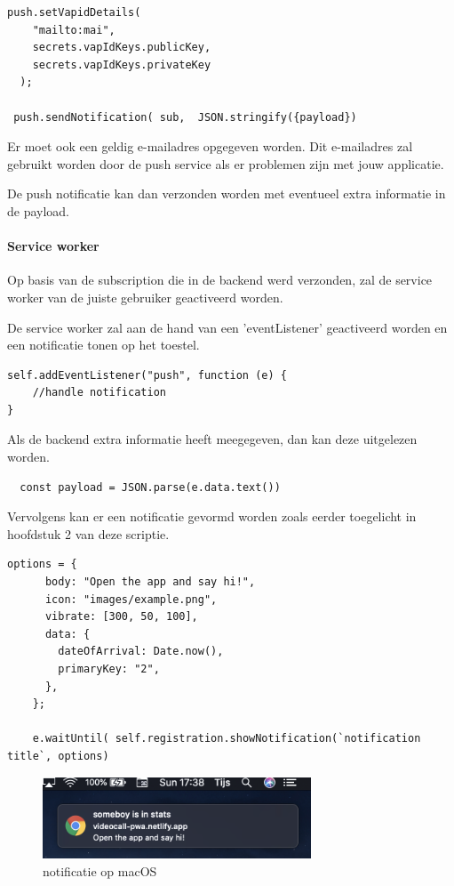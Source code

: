 \begin{lstlisting}
push.setVapidDetails(
    "mailto:mai",
    secrets.vapIdKeys.publicKey,
    secrets.vapIdKeys.privateKey
  );
  
 push.sendNotification( sub,  JSON.stringify({payload})
\end{lstlisting}

			Er moet ook een geldig e-mailadres opgegeven worden. Dit e-mailadres zal gebruikt worden door de push service als er problemen zijn met jouw applicatie.
			
			De push notificatie kan dan verzonden worden met eventueel extra informatie in de payload.
			
		\paragraph{Service worker}
		
			Op basis van de subscription die in de backend werd verzonden, zal de service worker van de juiste gebruiker geactiveerd worden.
			
			De service worker zal aan de hand van een 'eventListener' geactiveerd worden en een notificatie tonen op het toestel.
			
			
\begin{lstlisting}
self.addEventListener("push", function (e) {
	//handle notification
}
\end{lstlisting}
			
			Als de backend extra informatie heeft meegegeven, dan kan deze uitgelezen worden.
\begin{lstlisting}
  const payload = JSON.parse(e.data.text())
\end{lstlisting}
			
			Vervolgens kan er een notificatie gevormd worden zoals eerder toegelicht in hoofdstuk 2 van deze scriptie.
			
\begin{lstlisting}
options = {
      body: "Open the app and say hi!",
      icon: "images/example.png",
      vibrate: [300, 50, 100],
      data: {
        dateOfArrival: Date.now(),
        primaryKey: "2",
      },
    };

    e.waitUntil( self.registration.showNotification(`notification title`, options)
\end{lstlisting}

	\begin{figure}[H]
		\centering
				\includegraphics[width=80mm]{./img/notificationMacOs}{}		
		\caption{notificatie op macOS}
	\end{figure}
			
